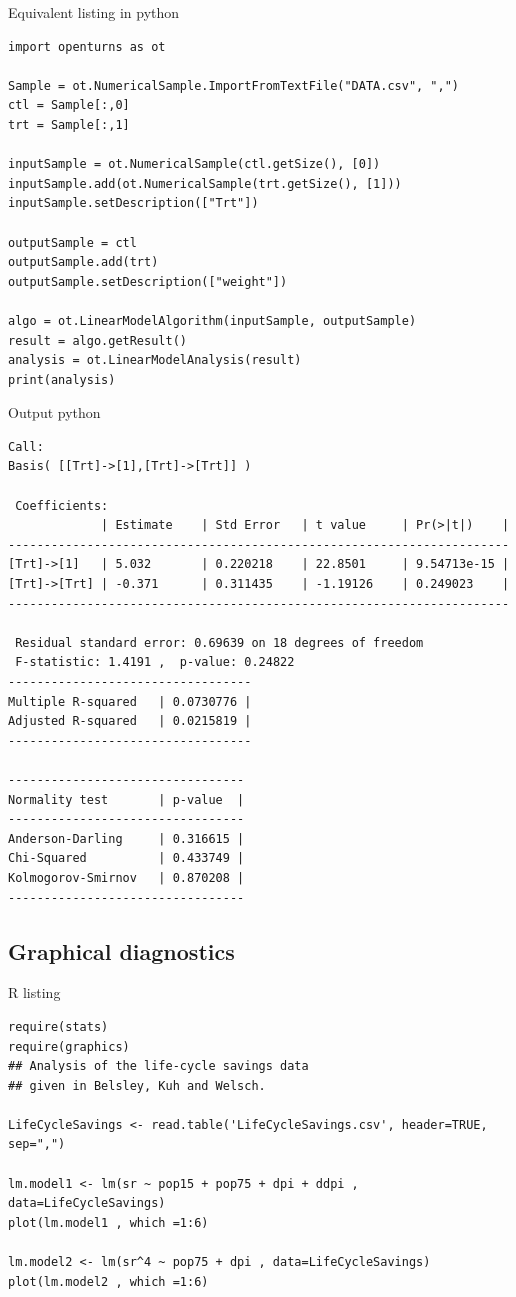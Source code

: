 \newpage
Equivalent listing in python
\begin{lstlisting}[style=pythonStyle]
import openturns as ot

Sample = ot.NumericalSample.ImportFromTextFile("DATA.csv", ",")
ctl = Sample[:,0]
trt = Sample[:,1]

inputSample = ot.NumericalSample(ctl.getSize(), [0])
inputSample.add(ot.NumericalSample(trt.getSize(), [1]))
inputSample.setDescription(["Trt"])

outputSample = ctl
outputSample.add(trt)
outputSample.setDescription(["weight"])

algo = ot.LinearModelAlgorithm(inputSample, outputSample)
result = algo.getResult()
analysis = ot.LinearModelAnalysis(result)
print(analysis)
\end{lstlisting}

Output python
\begin{lstlisting}[style=output]
 Call:
Basis( [[Trt]->[1],[Trt]->[Trt]] )

 Coefficients:
             | Estimate    | Std Error   | t value     | Pr(>|t|)    | 
----------------------------------------------------------------------
[Trt]->[1]   | 5.032       | 0.220218    | 22.8501     | 9.54713e-15 | 
[Trt]->[Trt] | -0.371      | 0.311435    | -1.19126    | 0.249023    | 
----------------------------------------------------------------------

 Residual standard error: 0.69639 on 18 degrees of freedom 
 F-statistic: 1.4191 ,  p-value: 0.24822
----------------------------------
Multiple R-squared   | 0.0730776 | 
Adjusted R-squared   | 0.0215819 | 
----------------------------------

---------------------------------
Normality test       | p-value  | 
---------------------------------
Anderson-Darling     | 0.316615 | 
Chi-Squared          | 0.433749 | 
Kolmogorov-Smirnov   | 0.870208 | 
---------------------------------
\end{lstlisting}

\newpage
\subsection{Graphical diagnostics}

R listing
\begin{lstlisting}[style=RStyle]
require(stats)
require(graphics)
## Analysis of the life-cycle savings data
## given in Belsley, Kuh and Welsch.

LifeCycleSavings <- read.table('LifeCycleSavings.csv', header=TRUE, sep=",")

lm.model1 <- lm(sr ~ pop15 + pop75 + dpi + ddpi , data=LifeCycleSavings)
plot(lm.model1 , which =1:6)

lm.model2 <- lm(sr^4 ~ pop75 + dpi , data=LifeCycleSavings)
plot(lm.model2 , which =1:6)
\end{lstlisting}

